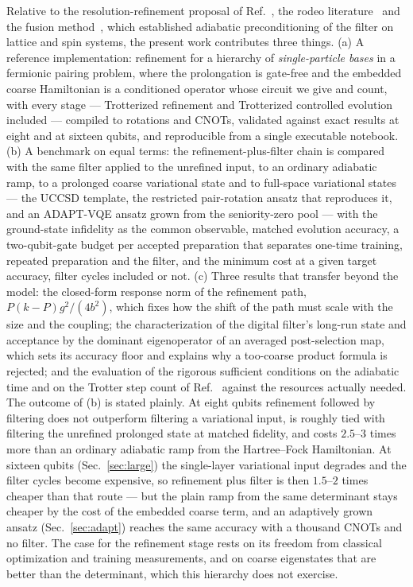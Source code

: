 \documentclass[
  aps,            %
  prc,            %
  reprint,        %
  superscriptaddress,
  floatfix,
  nofootinbib
]{revtex4-2}
\begin{document}
Relative to the resolution-refinement proposal of Ref.~\cite{Bogner2026}, the
rodeo literature~\cite{Choi2021,Qian2024} and the fusion
method~\cite{Patkowski2025fusion}, which established adiabatic preconditioning
of the filter on lattice and spin systems, the present work contributes
three things.  (a) A reference implementation: refinement for a hierarchy of
\emph{single-particle bases} in a fermionic pairing problem, where the
prolongation is gate-free and the embedded coarse Hamiltonian is a conditioned
operator whose circuit we give and count, with every stage --- Trotterized
refinement and Trotterized controlled evolution included --- compiled to
rotations and CNOTs, validated against exact results at eight and at sixteen
qubits, and reproducible from a single executable notebook.  (b) A benchmark
on equal terms: the refinement-plus-filter chain is compared with the same
filter applied to the unrefined input, to an ordinary adiabatic ramp, to a
prolonged coarse variational state and to full-space variational states ---
the UCCSD template, the restricted pair-rotation ansatz that reproduces it,
and an ADAPT-VQE ansatz grown from the seniority-zero pool --- with the
ground-state infidelity as the common observable, matched
evolution accuracy, a two-qubit-gate budget per accepted preparation that
separates one-time training, repeated preparation and the filter, and the
minimum cost at a given target accuracy, filter cycles included or not.
(c) Three results that transfer beyond the model: the closed-form response
norm of the refinement path, $P(k-P)g^2/(4b^2)$, which fixes how the shift
of the path must scale with the size and the coupling; the characterization
of the digital filter's long-run state and acceptance by the dominant
eigenoperator of an averaged post-selection map, which sets its accuracy
floor and explains why a too-coarse product formula is rejected; and the
evaluation of the rigorous sufficient conditions on the adiabatic time and
on the Trotter step count of Ref.~\cite{Sadia2026} against the resources
actually needed.  The outcome of (b) is stated plainly.  At eight qubits
refinement followed by filtering does not outperform filtering a variational
input, is roughly tied with filtering the unrefined prolonged state at
matched fidelity, and costs $2.5$--$3$ times more than an ordinary adiabatic
ramp from the Hartree--Fock Hamiltonian.  At sixteen qubits
(Sec.~\ref{sec:large}) the single-layer variational input degrades and the
filter cycles become expensive, so refinement plus filter is then
$1.5$--$2$ times cheaper than that route --- but the plain ramp from the
same determinant stays cheaper by the cost of the embedded coarse term, and
an adaptively grown ansatz (Sec.~\ref{sec:adapt}) reaches the same accuracy
with a thousand CNOTs and no filter.  The case for the
refinement stage rests on its freedom from classical optimization and
training measurements, and on coarse eigenstates that are better than the
determinant, which this hierarchy does not exercise.
\end{document}

